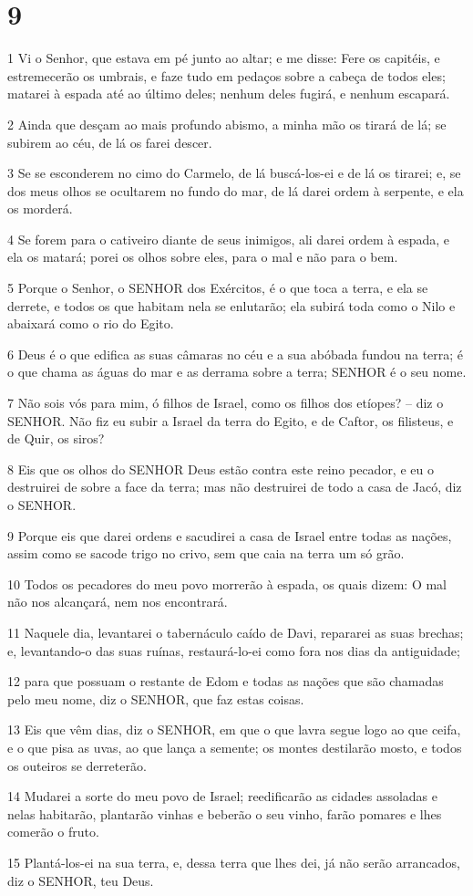 \chapter{9}

\par 1 Vi o Senhor, que estava em pé junto ao altar; e me disse: Fere os capitéis, e estremecerão os umbrais, e faze tudo em pedaços sobre a cabeça de todos eles; matarei à espada até ao último deles; nenhum deles fugirá, e nenhum escapará.
\par 2 Ainda que desçam ao mais profundo abismo, a minha mão os tirará de lá; se subirem ao céu, de lá os farei descer.
\par 3 Se se esconderem no cimo do Carmelo, de lá buscá-los-ei e de lá os tirarei; e, se dos meus olhos se ocultarem no fundo do mar, de lá darei ordem à serpente, e ela os morderá.
\par 4 Se forem para o cativeiro diante de seus inimigos, ali darei ordem à espada, e ela os matará; porei os olhos sobre eles, para o mal e não para o bem.
\par 5 Porque o Senhor, o SENHOR dos Exércitos, é o que toca a terra, e ela se derrete, e todos os que habitam nela se enlutarão; ela subirá toda como o Nilo e abaixará como o rio do Egito.
\par 6 Deus é o que edifica as suas câmaras no céu e a sua abóbada fundou na terra; é o que chama as águas do mar e as derrama sobre a terra; SENHOR é o seu nome.
\par 7 Não sois vós para mim, ó filhos de Israel, como os filhos dos etíopes? -- diz o SENHOR. Não fiz eu subir a Israel da terra do Egito, e de Caftor, os filisteus, e de Quir, os siros?
\par 8 Eis que os olhos do SENHOR Deus estão contra este reino pecador, e eu o destruirei de sobre a face da terra; mas não destruirei de todo a casa de Jacó, diz o SENHOR.
\par 9 Porque eis que darei ordens e sacudirei a casa de Israel entre todas as nações, assim como se sacode trigo no crivo, sem que caia na terra um só grão.
\par 10 Todos os pecadores do meu povo morrerão à espada, os quais dizem: O mal não nos alcançará, nem nos encontrará.
\par 11 Naquele dia, levantarei o tabernáculo caído de Davi, repararei as suas brechas; e, levantando-o das suas ruínas, restaurá-lo-ei como fora nos dias da antiguidade;
\par 12 para que possuam o restante de Edom e todas as nações que são chamadas pelo meu nome, diz o SENHOR, que faz estas coisas.
\par 13 Eis que vêm dias, diz o SENHOR, em que o que lavra segue logo ao que ceifa, e o que pisa as uvas, ao que lança a semente; os montes destilarão mosto, e todos os outeiros se derreterão.
\par 14 Mudarei a sorte do meu povo de Israel; reedificarão as cidades assoladas e nelas habitarão, plantarão vinhas e beberão o seu vinho, farão pomares e lhes comerão o fruto.
\par 15 Plantá-los-ei na sua terra, e, dessa terra que lhes dei, já não serão arrancados, diz o SENHOR, teu Deus.



